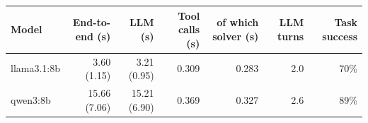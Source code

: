 \begin{tabular}{@{}lrrrrrr@{}}
\toprule
Model & End-to-end (s) & LLM (s) & Tool calls (s) & of which solver (s) & LLM turns & Task success \\
\midrule
llama3.1:8b & 3.60 (1.15) & 3.21 (0.95) & 0.309 & 0.283 & 2.0 & 70\% \\
qwen3:8b & 15.66 (7.06) & 15.21 (6.90) & 0.369 & 0.327 & 2.6 & 89\% \\
\bottomrule
\end{tabular}
